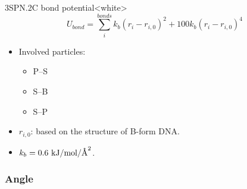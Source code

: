 \begin{smallpage}{3SPN.2C bond potential}<white>
  \begin{equation}
    \label{eq:dna_3spn2c_local_bond}
    U_{bond} = \sum_{i}^{bonds} k_b (r_i - r_{i,0})^2 + 100 k_b (r_i - r_{i,0})^4
  \end{equation}
  \tcblower
  \begin{itemize}
  \item Involved particles:
    \begin{itemize}
    \item P--S
    \item S--B
    \item S--P
    \end{itemize}
  \item $r_{i, 0}$: based on the structure of B-form DNA.
  \item $k_b = 0.6\ \mathrm{kJ/mol/\angstrom^2}$.
  \end{itemize}
\end{smallpage}



\subsubsection{Angle}
\label{sec:dna_3spn2c_potential_angle}

